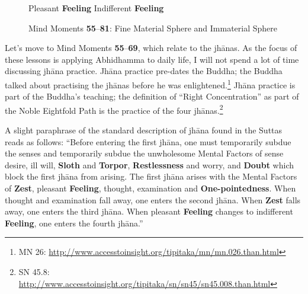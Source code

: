 \begin{figure}[H]
\begin{center}
\smiley\hspace{2mm} Pleasant \textbf{Feeling}\hspace{5mm}\neutral\hspace{2mm} Indifferent \textbf{Feeling}
\end{center}

\caption{Mind Moments \textbf{55}--\textbf{81}: Fine Material Sphere and Immaterial Sphere}
\label{fig:55to81}
\end{figure}

Let’s move to Mind Moments \textbf{55}--\textbf{69}, which relate to the jhānas. As the focus of these lessons is applying Abhidhamma to daily life, I will not spend a lot of time discussing jhāna practice. Jhāna practice pre-dates the Buddha; the Buddha talked about practising the jhānas before he was enlightened.\footnote{MN 26: \url{http://www.accesstoinsight.org/tipitaka/mn/mn.026.than.html}} Jhāna practice is part of the Buddha’s teaching; the definition of “Right Concentration” as part of the Noble Eightfold Path is the practice of the four jhānas.\footnote{SN 45.8: \url{http://www.accesstoinsight.org/tipitaka/sn/sn45/sn45.008.than.html}}

A slight paraphrase of the standard description of jhāna found in the Suttas reads as follows: “Before entering the first jhāna, one must temporarily subdue the senses and temporarily subdue the unwholesome Mental Factors of sense desire, ill will, \textbf{Sloth} and \textbf{Torpor}, \textbf{Restlessness} and worry, and \textbf{Doubt} which block the first jhāna from arising. The first jhāna arises with the Mental Factors of \textbf{Zest}, pleasant \textbf{Feeling}, thought, examination and \textbf{One-pointedness}. When thought and examination fall away, one enters the second jhāna. When \textbf{Zest} falls away, one enters the third jhāna. When pleasant \textbf{Feeling} changes to indifferent \textbf{Feeling}, one enters the fourth jhāna.”

